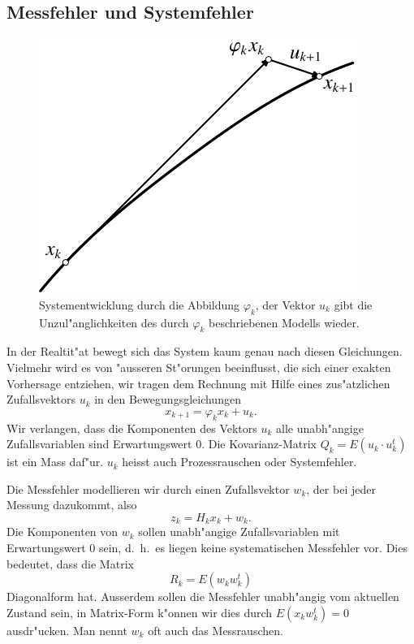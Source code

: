 \subsection{Messfehler und Systemfehler}
\begin{figure}
\centering
\includegraphics{images/filter-1.pdf}
\caption{Systementwicklung durch die Abbildung $\varphi_k$, der Vektor $u_k$
gibt die Unzul"anglichkeiten des durch $\varphi_k$ beschriebenen Modells
wieder.
\label{filter-systementwicklung}}
\end{figure}
In der Realtit"at bewegt sich das System kaum genau nach diesen Gleichungen.
Vielmehr wird es von "ausseren St"orungen beeinflusst, die sich einer
exakten Vorhersage entziehen, wir tragen dem Rechnung mit Hilfe eines
zus"atzlichen Zufallsvektors $u_k$ in den Bewegungsgleichungen
\[
x_{k+1}=\varphi_kx_k+ u_k.
\]
Wir verlangen, dass die Komponenten des Vektors $u_k$ alle unabh"angige
Zufallsvariablen sind Erwartungswert 0.
Die Kovarianz-Matrix $Q_k=E(u_k\cdot u_k^t)$ ist
ein Mass daf"ur.
$u_k$ heisst auch Prozessrauschen oder Systemfehler.

Die Messfehler modellieren wir durch einen
Zufallsvektor $w_k$, der bei jeder Messung dazukommt, also
\[
z_k=H_kx_k+w_k.
\]
Die Komponenten von $w_k$ sollen unabh"angige Zufallsvariablen mit
Erwartungswert $0$ sein, d.~h.~es liegen keine systematischen Messfehler
vor.
Dies bedeutet, dass die Matrix
\[
R_k=E(w_kw_k^t)
\]
Diagonalform hat.
Ausserdem sollen die Messfehler unabh"angig vom aktuellen Zustand
sein, in Matrix-Form k"onnen wir dies durch $E(x_kw_k^t)=0$ ausdr"ucken.
Man nennt $w_k$ oft auch das Messrauschen.

